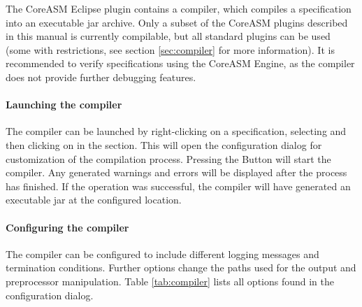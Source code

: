 \documentclass{article}
\newcommand{\CoreASM}{{\sffamily CoreASM}\xspace}
\begin{document}
\label{sec:compilerusage}

The CoreASM Eclipse plugin contains a compiler, which compiles a specification into an executable jar archive.
Only a subset of the CoreASM plugins described in this manual is currently compilable, but all standard plugins
can be used (some with restrictions, see section \ref{sec:compiler} for more information).
It is recommended to verify specifications using the \CoreASM Engine, as the compiler does not provide further
debugging features.

\paragraph{Launching the compiler}

The compiler can be launched by right-clicking on a specification, selecting  and then clicking on
 in the  section.
This will open the configuration dialog for customization of the compilation process.
Pressing the  Button will start the compiler. Any generated warnings and errors will be displayed
after the process has finished. If the operation was successful, the compiler will have generated an executable
jar at the configured location.

\paragraph{Configuring the compiler}

The compiler can be configured to include different logging messages and termination conditions.
Further options change the paths used for the output and preprocessor manipulation.
Table \ref{tab:compiler} lists all options found in the configuration dialog.
\end{document}
